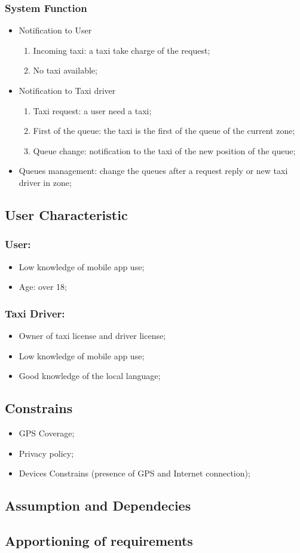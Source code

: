 \documentclass[english]{article}
\begin{document}
\subsubsection{System Function}
\begin{itemize}
	\item Notification to User
	\begin{enumerate}
		\item Incoming taxi: a taxi take charge of the request;
		\item No taxi available;
	\end{enumerate}
	\item Notification to Taxi driver
	\begin{enumerate}
		\item Taxi request: a user need a taxi;
		\item First of the queue: the taxi is the first of the queue of the current zone;
		\item Queue change: notification to the taxi of the new position of the queue;
	\end{enumerate}
	\item Queues management: change the queues after a request reply or new taxi driver in zone;
\end{itemize}

\subsection{User Characteristic}

\subsubsection{User:}
\begin{itemize}
	\item Low knowledge of mobile app use;
	\item Age: over 18;
\end{itemize}

\subsubsection{Taxi Driver:}
\begin{itemize}
	\item Owner of taxi license and driver license;
	\item Low knowledge of mobile app use;
	\item Good knowledge of the local language;
\end{itemize}

\subsection{Constrains}
\begin{itemize}
	\item GPS Coverage;
	\item Privacy policy;
	\item Devices Constrains (presence of GPS and Internet connection);
\end{itemize}

\subsection{Assumption and Dependecies}

\subsection{Apportioning of requirements}
\end{document}
